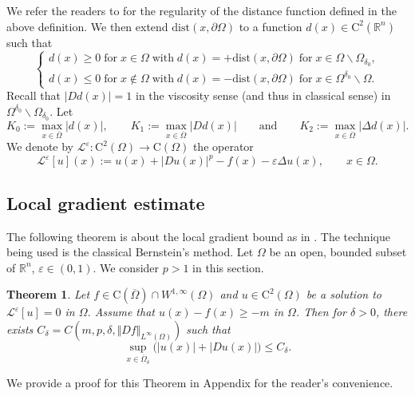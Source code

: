\documentclass[11pt,reqno]{amsart}
\numberwithin{figure}{section}
\theoremstyle{plain}
\newtheorem{thm}{Theorem}[section]
\theoremstyle{remark}
\numberwithin{equation}{section}
\newcommand{\R}{\mathbb{R}}
\newcommand{\rmC}{\mathrm{C}}
\begin{document}
We refer the readers to \cite{gilbarg_elliptic_2001} for the regularity of the distance function defined in the above definition. We then extend $\mathrm{dist}(x,\partial\Omega)$ to a function $d(x)\in \mathrm{C}^2(\mathbb{R}^n)$ such that 
\begin{equation}\label{e:distance_def}
    \begin{cases}
    d(x)\geq 0\;\text{for}\;x\in\Omega\;\text{with}\;d(x) = +\mathrm{dist}(x,\partial\Omega)\;\text{for}\;x\in \Omega\backslash \Omega_{\delta_0},\\
    d(x)\leq 0\;\text{for}\;x\notin \Omega\;\text{with}\;d(x) = -\mathrm{dist}(x,\partial\Omega)\;\text{for}\;x\in \Omega^{\delta_0}\backslash \Omega.
    \end{cases}
\end{equation}
Recall that $|D d(x)| = 1$ in the viscosity sense (and thus in classical sense) in $\Omega^{\delta_0}\backslash \Omega_{\delta_0}$. Let 
\begin{equation}\label{boundond}
   K_0:= \max_{x\in \overline{\Omega}}|d(x)|, \qquad K_1 := \max_{x\in \overline{\Omega}} |D d(x)| \qquad\text{and}\qquad K_2 := \max_{x\in \overline{\Omega}} |\Delta d(x)|.
\end{equation}
\noindent We denote by $\mathcal{L}^\varepsilon:\rmC^2(\Omega)\to \rmC(\Omega)$ the operator
\begin{equation*}
    \mathcal{L}^\varepsilon[u](x) :=   u(x) + |Du(x)|^p - f(x) - \varepsilon \Delta u(x), \qquad x\in \Omega.
\end{equation*}



\subsection{Local gradient estimate} 
The following theorem is about the local gradient bound as in \cite[Appendix]{Lasry1989}. The technique being used is the classical Bernstein's method. Let $\Omega$ be an open, bounded subset of $\R^n$, $\varepsilon \in (0,1)$. We consider $p>1$ in this section.

\begin{thm}\label{thm:grad_1} Let $f\in \rmC(\overline{\Omega})\cap W^{1,\infty}(\Omega)$ and $u\in \mathrm{C}^2(\Omega)$ be a solution to $\mathcal{L}^\varepsilon[u] = 0$ in $\Omega$. Assume that $  u(x)-f(x)\geq -m$ in $\Omega$. Then for $\delta>0$, there exists $C_\delta = C(m,p,\delta, \Vert D f\Vert_{L^\infty(\Omega)})$ such that 
\begin{equation*}
    \sup_{x\in \overline{\Omega}_\delta} \Big(|u(x)|+|Du(x)|\Big) \leq C_\delta.
\end{equation*}
\end{thm}
\noindent We provide a proof for this Theorem in Appendix for the reader's convenience.
\end{document}
